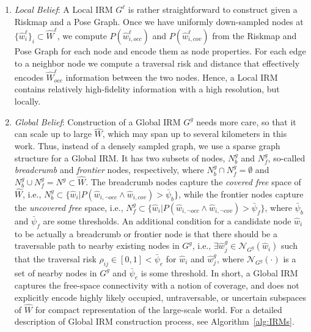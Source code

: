 \documentclass[letterpaper]{article} %
\begin{document}
\begin{enumerate}[label={\arabic*)}]
  \itemsep0em 
  \setlength{\itemsep}{0.2em}
  \item \textit{Local Belief}: 
  A Local IRM $G^\ell$ is rather straightforward to construct given a Riskmap and a Pose Graph.
Once we have uniformly down-sampled nodes at $\{\hat{w}^\ell_i\}_i \subset \hat{W}^\ell$, we compute $P(\hat{w}^\ell_{i,occ})$ and $P(\hat{w}^\ell_{i,cov})$ from the Riskmap and Pose Graph for each node and encode them as node properties. For each edge to a neighbor node we compute a traversal risk and distance that effectively encodes $\hat{W}^\ell_{occ}$ information between the two nodes.
Hence, a Local IRM contains relatively high-fidelity information with a high resolution, but locally.

  \item \textit{Global Belief}:
Construction of a Global IRM $G^g$ needs more care, so that it can scale up to large $\hat{W}$, which may span up to several kilometers in this work.
Thus, instead of a densely sampled graph, we use a sparse graph structure for a Global IRM.
%
It has two subsets of nodes, $N^g_b$ and $N^g_f$, so-called \textit{breadcrumb} and \textit{frontier} nodes, respectively, where $N^g_b \cap N^g_f = \emptyset$ and $N^g_b \cup N^g_f = N^g \! \subset \! \hat{W}$.
%
The breadcrumb nodes capture the \textit{covered free} space of $\hat{W}$, i.e., $N^g_b \subset \{\hat{w}_i | P(\hat{w}_{i,\neg occ} \wedge \hat{w}_{i,cov}) > \bar{\psi}_b\}$, while
the frontier nodes capture the \textit{uncovered free} space, i.e., $N^g_f \subset \{\hat{w}_i | P(\hat{w}_{i,\neg occ} \wedge \hat{w}_{i,\neg cov}) > \bar{\psi}_f\}$,
where $\bar{\psi}_b$ and $\bar{\psi}_f$ are some thresholds.
%
An additional condition for a candidate node $\hat{w}_i$ to be actually a breadcrumb or frontier node is that there should be a traversable path to nearby existing nodes in $G^g$, i.e., $\exists \hat{w}^g_j \in \mathcal{N}_{G^g}(\hat{w}_i)$ such that the traversal risk $\rho_{ij} \in [0, 1] < \bar{\psi}_e$ for $\hat{w}_i$ and $\hat{w}^g_j$, where $\mathcal{N}_{G^g}(\cdot)$ is a set of nearby nodes in $G^g$ and $\bar{\psi}_e$ is some threshold.
%
In short, a Global IRM captures the free-space connectivity with a notion of coverage, and does not explicitly encode highly likely occupied, untraversable, or uncertain subspaces of $\hat{W}$ for compact representation of the large-scale world.
%
For a detailed description of Global IRM construction process, see Algorithm~\ref{alg:IRMs}.
\end{enumerate}
\end{document}
